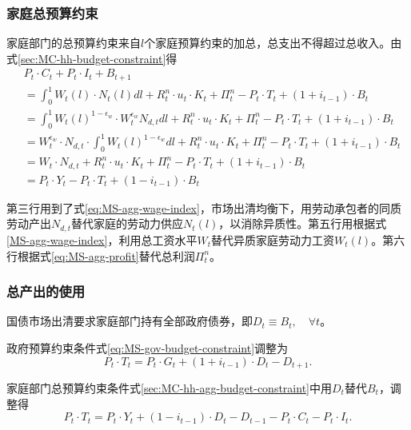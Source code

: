 \subsubsection{家庭总预算约束}
家庭部门的总预算约束来自$l$个家庭预算约束的加总，总支出不得超过总收入。由式\eqref{sec:MC-hh-budget-constraint}得
\begin{equation}
\label{sec:MC-hh-agg-budget-constraint}
\begin{split}
&P_t \cdot C_t + P_t \cdot I_t + B_{t+1} \\
&= \int_{0}^{1} W_t(l) \cdot N_{t}(l) dl + R^n_t \cdot u_t \cdot K_t + \Pi^n_t - P_t \cdot T_t + \left(1 + i_{t-1} \right) \cdot B_t \\
&= \int_{0}^{1} W_t(l)^{1-\epsilon_w} \cdot W_t^{\epsilon_w} N_{d,t}dl + R^n_t \cdot u_t \cdot K_t + \Pi^n_t - P_t \cdot T_t + \left(1 + i_{t-1} \right) \cdot B_t \\
&= W_t^{\epsilon_w} \cdot N_{d,t} \cdot \int^{1}_{0} W_{t}(l)^{1-\epsilon_w} dl + R^n_t \cdot u_t \cdot K_t + \Pi^n_t - P_t \cdot T_t + \left(1 + i_{t-1} \right) \cdot B_t \\
&= W_t \cdot N_{d,t} + R^n_t \cdot u_t \cdot K_t + \Pi^n_t - P_t \cdot T_t + \left(1 + i_{t-1} \right) \cdot B_t \\
&= P_t \cdot Y_t - P_t \cdot T_t +\left( 1 - i_{t-1} \right) \cdot B_t
\end{split}
\end{equation}

第三行用到了式\eqref{eq:MS-agg-wage-index}，市场出清均衡下，用劳动承包者的同质劳动产出$N_{d,t}$替代家庭的劳动力供应$N_{t}(l)$，以消除异质性。第五行用根据式\eqref{MS-agg-wage-index}，利用总工资水平$W_{t}$替代异质家庭劳动力工资$W_t(l)$。第六行根据式\eqref{eq:MS-agg-profit}替代总利润$\Pi^n_t$。

\subsubsection{总产出的使用}
国债市场出清要求家庭部门持有全部政府债券，即$D_t \equiv B_t, \quad \forall t$。

政府预算约束条件式\eqref{eq:MS-gov-budget-constraint}调整为
\begin{equation*}
P_t \cdot T_t = P_t \cdot G_t + \left( 1 + i_{t-1} \right) \cdot D_t - D_{t+1}.
\end{equation*}

家庭部门总预算约束条件式\eqref{sec:MC-hh-agg-budget-constraint}中用$D_t$替代$B_t$，调整得
\begin{equation*}
P_t \cdot T_t = P_t \cdot Y_t + \left( 1 - i_{t-1} \right) \cdot D_t - D_{t-1} - P_t \cdot C_t - P_t \cdot I_t.
\end{equation*}

